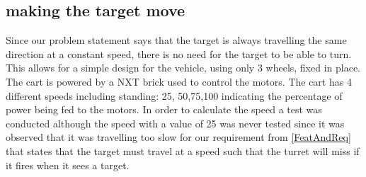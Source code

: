 \subsection{making the target move}
Since our problem statement says that the target is always travelling the same direction
at a constant speed, there is no need for the target to be able to turn. This allows
for a simple design for the vehicle, using only 3 wheels, fixed in place. The cart
is powered by a NXT brick used to control the motors. The cart has 4 different speeds including standing:
25, 50,75,100 indicating the percentage of power being fed to the motors. In order to
calculate the speed a test was conducted
although the speed with a value of 25 was never tested since it was observed that
it was travelling too slow for our requirement from \autoref{FeatAndReq} that states
that the target must travel at a speed such that the turret will miss if it fires when
it sees a target.
